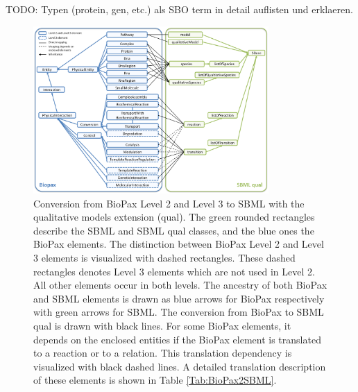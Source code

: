 \documentclass{bioinfo}
\begin{document}
\begin{methods}
TODO: Typen (protein, gen, etc.) als SBO term in detail auflisten und erklaeren.
\begin{figure}[t!h]
\centering \includegraphics[width=0.8\textwidth]{BioPaxSBMLqual.png}
\caption{Conversion from BioPax Level 2 and Level 3 to SBML with the qualitative models extension (qual). The green rounded rectangles describe the SBML and SBML qual classes, and the blue ones the BioPax elements. The distinction between BioPax Level 2 and Level 3 elements is visualized with dashed rectangles. These dashed rectangles denotes Level 3 elements which are not used in Level 2. All other elements occur in both levels. The ancestry of both BioPax and SBML elements is drawn as blue arrows for BioPax respectively with green arrows for SBML. The conversion from BioPax to SBML qual is drawn with black lines. For some BioPax elements, it depends on the enclosed entities if the BioPax element is translated to a reaction or to a relation. This translation dependency is visualized with black dashed lines. A detailed translation description of these elements is shown in Table \ref{Tab:BioPax2SBML}.}\label{fig:BioPaxSBMLqual}
\end{figure}


\end{methods}
\end{document}

